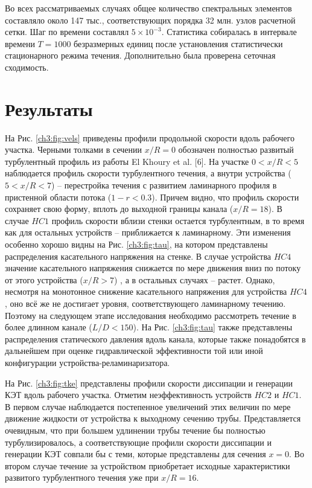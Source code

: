 Во всех рассматриваемых случаях общее количество спектральных элементов составляло около 147 тыс., соответствующих порядка 32 млн. узлов расчетной сетки. 
%
Шаг по времени составлял $5\times10^{-3}$. 
%
Статистика собиралась в интервале времени $T = 1000$ безразмерных единиц после установления статистически стационарного режима течения. 
%
Дополнительно была проверена сеточная сходимость.
%

\section{Результаты}\label{ch3:results}
%
На Рис. \ref{ch3:fig:vels} приведены профили продольной скорости вдоль рабочего участка. 
%
Черными толками в сечении $x/R = 0$ обозначен полностью развитый турбулентный профиль из работы El Khoury et al. [6]. 
%
На участке $0 < x/R < 5$ наблюдается профиль скорости турбулентного течения, а внутри устройства ($5 < x/R < 7$) -- перестройка течения с развитием ламинарного профиля в пристенной области потока ($1-r < 0.3$). 
%
Причем видно, что профиль скорости сохраняет свою форму, вплоть до выходной границы канала ($x/R = 18$). 
%
В случае $HC1$ профиль скорости вблизи стенки остается турбулентным, в то время как для остальных устройств -- приближается к ламинарному. 
%
Эти изменения особенно хорошо видны на Рис. \ref{ch3:fig:tau}, на котором представлены распределения касательного напряжения на стенке. 
%
В случае устройства $HC4$ значение касательного напряжения снижается по мере движения вниз по потоку от этого устройства ($x/R > 7$) , а в остальных случаях -- растет. 
%
Однако, несмотря на монотонное снижение касательного напряжения для устройства $HC4$, оно всё же не достигает уровня, соответствующего ламинарному течению. 
%
Поэтому на следующем этапе исследования необходимо рассмотреть течение в более длинном канале ($L/D < 150$). 
%
На Рис. \ref{ch3:fig:tau} также представлены распределения статического давления вдоль канала, которые также понадобятся в дальнейшем при оценке гидравлической эффективности той или иной конфигурации устройства-реламинаризатора.
%


%
На Рис. \ref{ch3:fig:tke} представлены профили скорости диссипации и генерации КЭТ вдоль рабочего участка. 
%
Отметим неэффективность устройств $HC2$ и $HC1$. 
%
В первом случае наблюдается постепенное увеличений этих величин по мере движение жидкости от устройства к выходному сечению трубы. 
%
Представляется очевидным, что при большем удлинении трубы течение бы полностью турбулизировалось, а соответствующие профили скорости диссипации и генерации КЭТ совпали бы с теми, которые представлены для сечения $x = 0$. 
%
Во втором случае течение за устройством приобретает исходные характеристики развитого турбулентного течения уже при $x/R = 16$.
%




